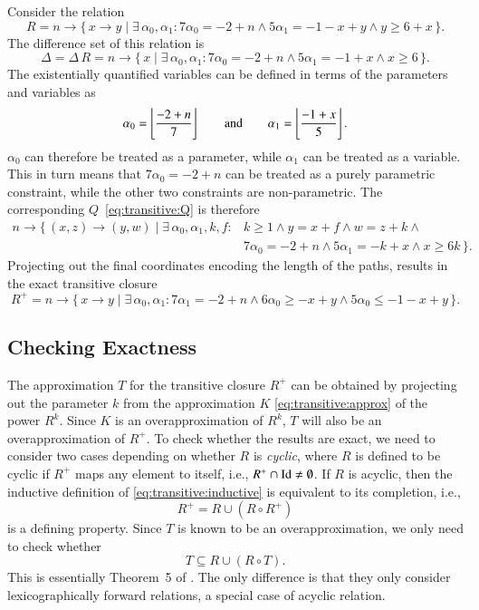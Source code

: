 \begin{example}
Consider the relation
$$
R =
n \to \{\, x \to y \mid \exists \, \alpha_0, \alpha_1: 7\alpha_0 = -2 + n \wedge 5\alpha_1 = -1 - x + y \wedge y \ge 6 + x \,\}
.
$$
The difference set of this relation is
$$
\Delta = \Delta \, R =
n \to \{\, x \mid \exists \, \alpha_0, \alpha_1: 7\alpha_0 = -2 + n \wedge 5\alpha_1 = -1 + x \wedge x \ge 6 \,\}
.
$$
The existentially quantified variables can be defined in terms
of the parameters and variables as
$$
\alpha_0 = \left\lfloor\frac{-2 + n}7\right\rfloor
\qquad
\text{and}
\qquad
\alpha_1 = \left\lfloor\frac{-1 + x}5\right\rfloor
.
$$
$\alpha_0$ can therefore be treated as a parameter,
while $\alpha_1$ can be treated as a variable.
This in turn means that $7\alpha_0 = -2 + n$ can be treated as
a purely parametric constraint, while the other two constraints are
non-parametric.
The corresponding $Q$~\eqref{eq:transitive:Q} is therefore
$$
\begin{aligned}
n \to \{\, (x,z) \to (y,w) \mid
\exists\, \alpha_0, \alpha_1, k, f : {} &
k \ge 1 \wedge
y = x + f \wedge
w = z + k \wedge {} \\
&
7\alpha_0 = -2 + n \wedge
5\alpha_1 = -k + x \wedge
x \ge 6 k
\,\}
.
\end{aligned}
$$
Projecting out the final coordinates encoding the length of the paths,
results in the exact transitive closure
$$
R^+ =
n \to \{\, x \to y \mid \exists \, \alpha_0, \alpha_1: 7\alpha_1 = -2 + n \wedge 6\alpha_0 \ge -x + y \wedge 5\alpha_0 \le -1 - x + y \,\}
.
$$
\end{example}

\subsection{Checking Exactness}

The approximation $T$ for the transitive closure $R^+$ can be obtained
by projecting out the parameter $k$ from the approximation $K$
\eqref{eq:transitive:approx} of the power $R^k$.
Since $K$ is an overapproximation of $R^k$, $T$ will also be an
overapproximation of $R^+$.
To check whether the results are exact, we need to consider two
cases depending on whether $R$ is {\em cyclic}, where $R$ is defined
to be cyclic if $R^+$ maps any element to itself, i.e.,
$R^+ \cap \mathop{\rm Id}\nolimits \ne \emptyset$.
If $R$ is acyclic, then the inductive definition of
\eqref{eq:transitive:inductive} is equivalent to its completion,
i.e.,
$$
R^+ = R \cup \left(R \circ R^+\right)
$$
is a defining property.
Since $T$ is known to be an overapproximation, we only need to check
whether
$$
T \subseteq R \cup \left(R \circ T\right)
.
$$
This is essentially Theorem~5 of .
The only difference is that they only consider lexicographically
forward relations, a special case of acyclic relation.

